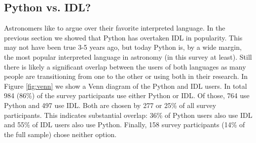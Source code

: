 \subsection{Python vs. IDL?}

Astronomers like to argue over their favorite interpreted language. In the previous section we showed that Python has overtaken IDL in popularity. This may not have been true 3-5 years ago, but today Python is, by a wide margin, the most popular interpreted language in astronomy (in this survey at least). Still there is likely a significant overlap between the users of both languages as many people are transitioning from one to the other or using both in their research. In Figure \ref{fig:venn} we show a Venn diagram of the Python and IDL users. In total 984 (86\%) of the survey participants use either Python or IDL. Of those, 764 use Python and 497 use IDL. Both are chosen by 277 or 25\% of all survey participants. This indicates substantial overlap: 36\% of Python users also use IDL and 55\% of IDL users also use Python. Finally, 158 survey participants (14\% of the full sample) chose neither option.
